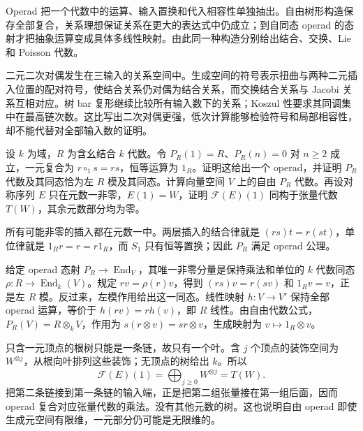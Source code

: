



\begin{chaptersummary}
	Operad 把一个代数中的运算、输入置换和代入相容性单独抽出。自由树形构造保存全部复合，关系理想保证关系在更大的表达式中仍成立；到自同态 operad 的态射才把抽象运算变成具体多线性映射。由此同一种构造分别给出结合、交换、Lie 和 Poisson 代数。

	\ProseParagraphBreak
	二元二次对偶发生在三输入的关系空间中。生成空间的符号表示扭曲与两种二元插入位置的配对符号，使结合关系仍对偶为结合关系，而交换结合关系与 Jacobi 关系互相对应。树 bar 复形继续比较所有输入数下的关系；Koszul 性要求其同调集中在最高链次数。这比写出二次对偶更强，低次计算能够检验符号和局部相容性，却不能代替对全部输入数的证明。
\end{chaptersummary}

\BookExercises

\begin{exercise}\label{b4:ex:unary-operad-modules}
	设 \(k\) 为域，\(R\) 为含幺结合 \(k\) 代数。令 \(P_R(1)=R\)、\(P_R(n)=0\) 对 \(n\geq2\) 成立，一元复合为 \(r\circ_1s=rs\)，恒等运算为 \(1_R\)。证明这给出一个 operad，并证明 \(P_R\) 代数及其同态恰为左 \(R\) 模及其同态。计算向量空间 \(V\) 上的自由 \(P_R\) 代数。再设对称序列 \(E\) 只在元数一非零，\(E(1)=W\)，证明 \(\mathcal F(E)(1)\) 同构于张量代数 \(T(W)\)，其余元数部分均为零。
\end{exercise}
\begin{solution}
	所有可能非零的插入都在元数一中。两层插入的结合律就是 \((rs)t=r(st)\)，单位律就是 \(1_Rr=r=r1_R\)，而 \(S_1\) 只有恒等置换；因此 \(P_R\) 满足 operad 公理。

	给定 operad 态射 \(P_R\rightarrow\operatorname{End}_V\)，其唯一非零分量是保持乘法和单位的 \(k\) 代数同态 \(\rho:R\rightarrow\operatorname{End}_k(V)\)。规定 \(rv=\rho(r)v\)，得到 \((rs)v=r(sv)\) 和 \(1_Rv=v\)，正是左 \(R\) 模。反过来，左模作用给出这一同态。线性映射 \(h:V\rightarrow V'\) 保持全部 operad 运算，等价于 \(h(rv)=rh(v)\)，即 \(R\) 线性。由自由代数公式，\(P_R(V)=R\otimes_kV\)，作用为 \(s(r\otimes v)=sr\otimes v\)，生成映射为 \(v\mapsto1_R\otimes v\)。

	只含一元顶点的根树只能是一条链，故只有一个叶。含 \(j\) 个顶点的装饰空间为 \(W^{\otimes j}\)，从根向叶排列这些装饰；无顶点的树给出 \(k\)。所以
	\[
		\mathcal F(E)(1)=\bigoplus_{j\geq0}W^{\otimes j}=T(W).
	\]
	把第二条链接到第一条链的输入端，正是把第二组张量接在第一组后面，因而 operad 复合对应张量代数的乘法。没有其他元数的树。这也说明自由 operad 即使生成元空间有限维，一元部分仍可能是无限维的。
\end{solution}

